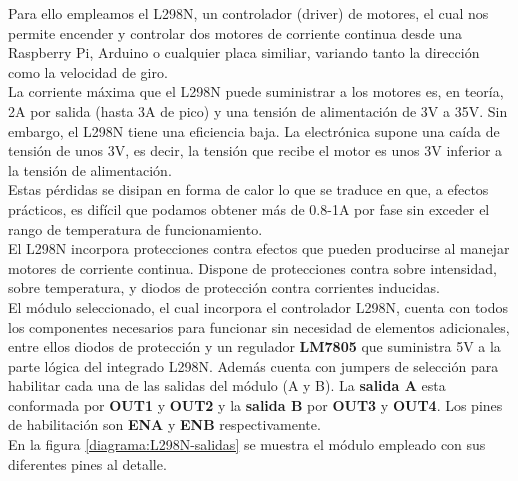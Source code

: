 Para ello empleamos el L298N, un controlador (driver) de motores, el cual nos permite encender y controlar dos motores de corriente continua desde una Raspberry Pi, Arduino o cualquier placa similiar,
variando tanto la dirección como la velocidad de giro.\\

La corriente máxima que el L298N puede suministrar a los motores es, en teoría, 2A por salida (hasta 3A de pico) y una tensión de alimentación de 3V a 35V. Sin embargo, el L298N tiene una 
eficiencia baja. La electrónica supone una caída de tensión de unos 3V, es decir, la tensión que recibe el motor es unos 3V inferior a la tensión de alimentación.\\

Estas pérdidas se disipan en forma de calor lo que se traduce en que, a efectos prácticos, es difícil que podamos obtener más de 0.8-1A por fase sin exceder el rango de temperatura de funcionamiento.\\

El L298N incorpora protecciones contra efectos que pueden producirse al manejar motores de corriente continua. Dispone de protecciones contra sobre intensidad, sobre temperatura, y diodos de protección
contra corrientes inducidas.\\

El módulo seleccionado, el cual incorpora el controlador L298N, cuenta con todos los componentes necesarios para funcionar sin necesidad de elementos adicionales, entre ellos diodos de protección
y un regulador \textbf{LM7805} que suministra 5V a la parte lógica del integrado L298N. Además cuenta con jumpers de selección para habilitar cada una de las salidas del módulo (A y B).
La \textbf{salida A} esta conformada por \textbf{OUT1} y \textbf{OUT2} y la \textbf{salida B} por \textbf{OUT3} y \textbf{OUT4}. Los pines de habilitación son \textbf{ENA} y \textbf{ENB} respectivamente.\\

En la figura \ref{diagrama:L298N-salidas} se muestra el módulo empleado con sus diferentes pines al detalle.\\


